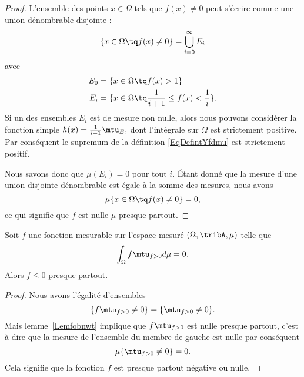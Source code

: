 \begin{proof}
    L'ensemble des points \( x\in\Omega\) tels que \( f(x)\neq 0\) peut s'écrire comme une union dénombrable disjointe :
    \begin{equation}
        \{ x\in\Omega\tq f(x)\neq 0 \}=\bigcup_{i=0}^{\infty}E_i
    \end{equation}
    avec
    \begin{subequations}
        \begin{align}
            E_0&=\{ x\in\Omega\tq f(x)>1 \}\\
            E_i&=\{ x\in\Omega\tq \frac{1}{ i+1 }\leq f(x)<\frac{1}{ i } \}.
        \end{align}
    \end{subequations}
    Si un des ensembles \( E_i\) est de mesure non nulle, alors nous pouvons considérer la fonction simple \( h(x)=\frac{1}{ i+1 }\mtu_{E_i}\) dont l'intégrale sur \( \Omega\) est strictement positive. Par conséquent le supremum de la définition \eqref{EqDefintYfdmu} est strictement positif.

    Nous savons donc que \( \mu(E_i)=0\) pour tout \( i\). Étant donné que la mesure d'une union disjointe dénombrable est égale à la somme des mesures, nous avons
    \begin{equation}
        \mu\{ x\in\Omega\tq f(x)\neq 0 \}=0,
    \end{equation}
    ce qui signifie que \( f\) est nulle \( \mu\)-presque partout.
\end{proof}

\begin{corollary}   \label{CorjLYiSm}
    Soit \( f\) une fonction mesurable sur l'espace mesuré \( (\Omega,\tribA,\mu)\) telle que
    \begin{equation}
        \int_{\Omega}f\mtu_{f>0}d\mu=0.
    \end{equation}
    Alors \( f\leq 0\) presque partout.
\end{corollary}

\begin{proof}
    Nous avons l'égalité d'ensembles
    \begin{equation}
        \{ f\mtu_{f>0}\neq 0 \}=\{ \mtu_{f>0}\neq 0 \}.
    \end{equation}
    Mais lemme~\ref{Lemfobnwt} implique que \( f\mtu_{f>0}\) est nulle presque partout, c'est à dire que la mesure de l'ensemble du membre de gauche est nulle par conséquent
    \begin{equation}
        \mu\{ \mtu_{f>0}\neq 0 \}=0.
    \end{equation}
    Cela signifie que la fonction \( f\) est presque partout négative ou nulle.
\end{proof}

